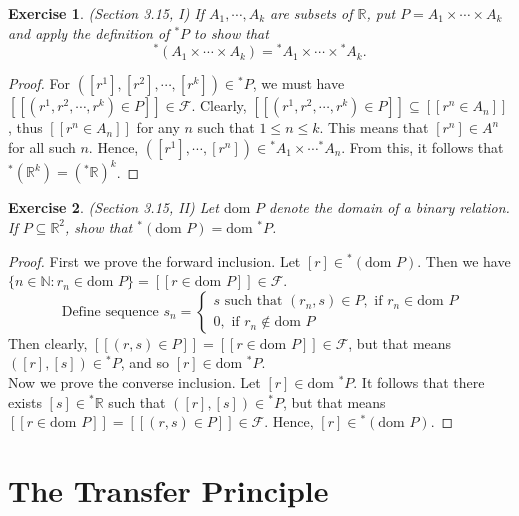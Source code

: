 \documentclass[a4paper, 11pt]{book}
\theoremstyle{plain}
\newtheorem{exercise}{Exercise}[chapter]
\theoremstyle{plain}
\newcommand{\mc}{\mathcal}
\newcommand{\N}{\mathbb{N}}
\newcommand{\R}{\mathbb{R}}
\newcommand{\hyp}{{}^*}
\newcommand{\dom}{\text{dom }}
\begin{document}
  \begin{exercise}
    (Section 3.15, I)
    If $A_1,\cdots, A_k$ are subsets of $\R$, put $P=A_1\times \cdots \times A_k$ and apply the definition of $\hyp P$ to show that $$ \hyp (A_1 \times \cdots \times A_k)=\hyp A_1 \times \cdots \times \hyp A_k.$$
  \end{exercise}
  \begin{proof}
    For $([r^1], [r^2], \cdots, [r^k]) \in \hyp P$, we must have $[[(r^1, r^2, \cdots, r^k) \in P]] \in \mc{F}$. Clearly, $[[(r^1, r^2, \cdots, r^k) \in P]] \subseteq [[r^n \in A_n]]$, thus $[[r^n \in A_n]]$ for any $n$ such that $1 \leq n \leq k$. This means that $[r^n] \in A^n$ for all such $n$. Hence, $([r^1], \cdots, [r^n]) \in \hyp A_1 \times \cdots \hyp A_n$. From this, it follows that $\hyp (\R^k)=(\hyp \R)^k$.
  \end{proof}

  \begin{exercise}
    (Section 3.15, II)
    Let $\dom P$ denote the domain of a binary relation. If $P \subseteq \R^2$, show that $\hyp (\dom P)= \dom \hyp P$.
  \end{exercise}
  \begin{proof}
    First we prove the forward inclusion. Let $[r] \in \hyp (\dom P)$. Then we have $\{n \in \N: r_n \in \dom P\}=[[r \in \dom P]] \in \mc{F}$. $$\text{ Define sequence } s_n = \begin{cases} s \text{ such that } (r_n, s) \in P, \text{ if } r_n \in \dom P \\ 0, \text{ if } r_n \notin \dom P \end{cases}$$ Then clearly, $[[(r,s) \in P]]=[[r \in \dom P]] \in \mc{F}$, but that means $([r], [s]) \in \hyp P$, and so $[r] \in \dom \hyp P$. \\
    Now we prove the converse inclusion. Let $[r] \in \dom \hyp P$. It follows that there exists $[s] \in \hyp \R$ such that $([r], [s]) \in \hyp P$, but that means $[[r \in \dom P]]=[[(r,s) \in P]] \in \mc{F}$. Hence, $[r] \in \hyp (\dom P)$.
  \end{proof}

\chapter{The Transfer Principle}
\end{document}
